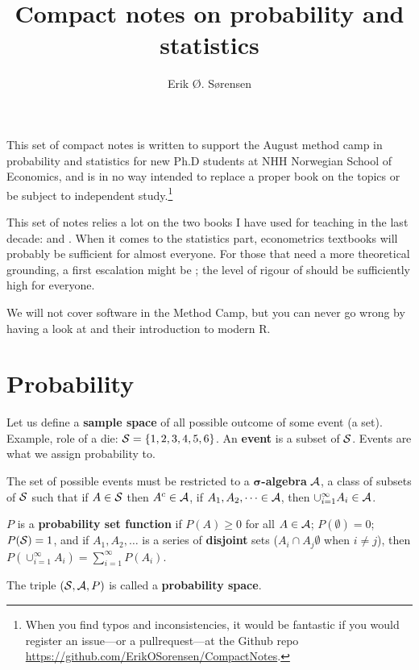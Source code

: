 \documentclass[twoside]{article}
\title{Compact notes on probability and statistics}
\author{Erik Ø. Sørensen}
\begin{document}
\maketitle
\sloppy
\frenchspacing



\tableofcontents
\thispagestyle{empty}
\newpage
\noindent This set of compact notes is written to support the August method camp
in probability and statistics for new Ph.D students at NHH Norwegian School of
Economics, and is in no way intended to replace a proper book on the topics or
be subject to independent study.\footnote{When you find typos and inconsistencies,
it would be fantastic if you would register an issue---or a pullrequest---at the
Github repo \url{https://github.com/ErikOSorensen/CompactNotes}.}

This set of notes relies a lot on the two books
I have used for teaching in the last decade: \citet{Hogg2013} and
\citet{Linton2017}. When it comes to the statistics part, econometrics textbooks
will probably be sufficient for almost everyone. For those that need a more
theoretical grounding, a first escalation might be \citet{Rosenthal2006}; the
level of rigour of \citet{Billingsley1995} should be sufficiently high for
everyone.


We will not cover software in the Method Camp, but you can never go wrong by
having a look at \citet{Wickham2017} and their introduction to modern R.


\section{Probability}
Let us define a \textbf{sample space} of all possible outcome of some
event (a set). Example, role of a die: $\mathcal{S} =\{1,2,3,4,5,6\}$. 
An \textbf{event} is a subset of $\mathcal{S}$. Events are what we assign probability
to.

The set of possible events must be restricted to a $\mathbf{\sigma}$\textbf{-algebra} $\mathcal{A}$,
a class of subsets of $\mathcal{S}$ such that if $A\in\mathcal{S}$ then $A^c\in\mathcal{A}$, if $A_1,A_2,\dots\in \mathcal{A}$,
then $\cup_{i=1}^\infty A_i \in \mathcal{A}$. 

$P$ is a \textbf{probability set function} if $P(A)\geq0$ for all $A\in\mathcal{A}$; $P(\emptyset)=0$; $P(\mathcal{S})=1$,
and if $A_1,A_2,\dots$ is a series of \textbf{disjoint} sets ($A_i\cap A_j\emptyset$ when $i\neq j$), then
$P(\cup_{i=1}^\infty A_i)=\sum_{i=1}^\infty P(A_i)$.


The triple $(\mathcal{S},\mathcal{A},P)$ is called a \textbf{probability space}.
\end{document}
